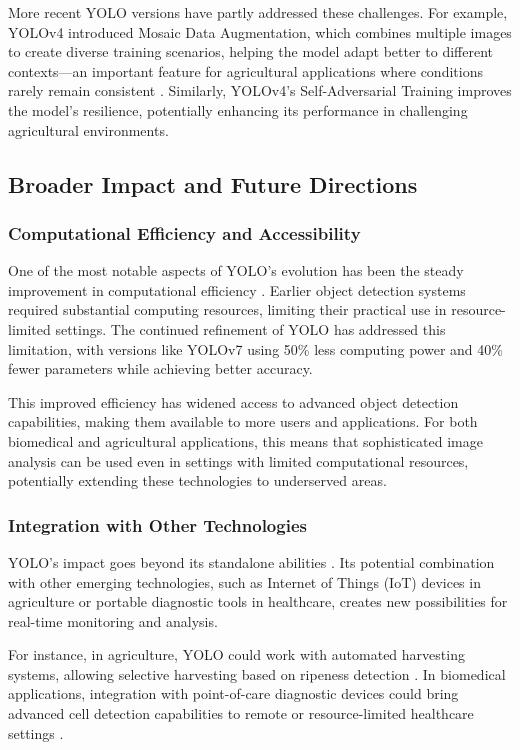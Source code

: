 \begin{multicols}{2}
	More recent YOLO versions have partly addressed these challenges. For example, YOLOv4 introduced Mosaic Data Augmentation, which combines multiple images to create diverse training scenarios, helping the model adapt better to different contexts—an important feature for agricultural applications where conditions rarely remain consistent \citep{bochkovskiy2020yolov4}. Similarly, YOLOv4's Self-Adversarial Training improves the model's resilience, potentially enhancing its performance in challenging agricultural environments.

	\subsection{Broader Impact and Future Directions}
	\subsubsection{Computational Efficiency and Accessibility}
	One of the most notable aspects of YOLO's evolution has been the steady improvement in computational efficiency \citep{Ultralytics2024}. Earlier object detection systems required substantial computing resources, limiting their practical use in resource-limited settings. The continued refinement of YOLO has addressed this limitation, with versions like YOLOv7 using 50\% less computing power and 40\% fewer parameters while achieving better accuracy.

	This improved efficiency has widened access to advanced object detection capabilities, making them available to more users and applications. For both biomedical and agricultural applications, this means that sophisticated image analysis can be used even in settings with limited computational resources, potentially extending these technologies to underserved areas.

	\subsubsection{Integration with Other Technologies}
	YOLO's impact goes beyond its standalone abilities \citep{8627998}. Its potential combination with other emerging technologies, such as Internet of Things (IoT) devices in agriculture or portable diagnostic tools in healthcare, creates new possibilities for real-time monitoring and analysis.

	For instance, in agriculture, YOLO could work with automated harvesting systems, allowing selective harvesting based on ripeness detection \citep{Koirala2019}. In biomedical applications, integration with point-of-care diagnostic devices could bring advanced cell detection capabilities to remote or resource-limited healthcare settings \citep{ChanCell2020}.
\end{multicols}